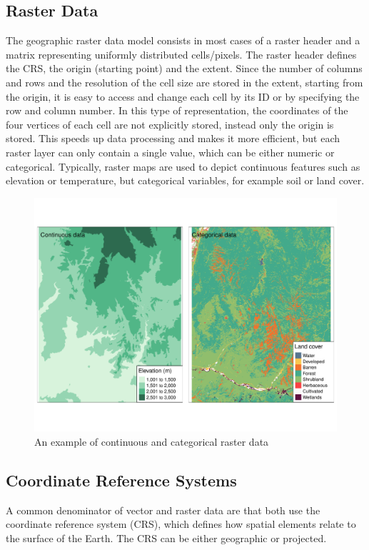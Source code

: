 \subsection{Raster Data}
The geographic raster data model consists in most cases of a raster header and a matrix representing uniformly distributed cells/pixels. The raster header defines the CRS, the origin (starting point) and the extent. Since the number of columns and rows and the resolution of the cell size are stored in the extent, starting from the origin, it is easy to access and change each cell by its ID or by specifying the row and column number. In this type of representation, the coordinates of the four vertices of each cell are not explicitly stored, instead only the origin is stored. This speeds up data processing and makes it more efficient, but each raster layer can only contain a single value, which can be either numeric or categorical. Typically, raster maps are used to depict continuous features such as elevation or temperature, but categorical variables, for example soil or land cover.
\begin{figure}[H]
   \centering
       \includegraphics[page=1,width=\textwidth]{raster.pdf}
 \caption{An example of continuous and categorical raster data}
 \label{fig:raster}
\end{figure}
\subsection*{Coordinate Reference Systems}
A common denominator of vector and raster data are that both use the coordinate reference system (CRS), which defines how spatial elements relate to the surface of the Earth. The CRS can be either geographic or projected.
